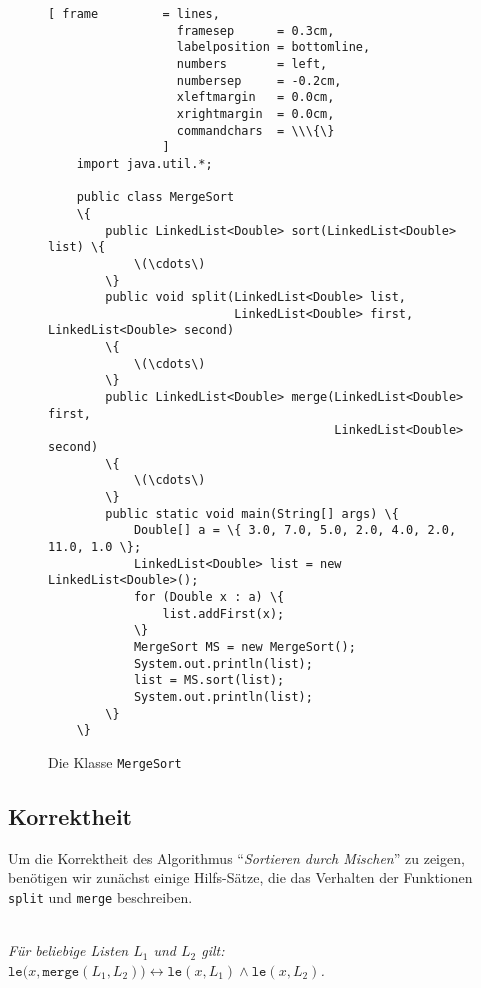\begin{figure}[!ht]
\centering
\begin{Verbatim}[ frame         = lines, 
                  framesep      = 0.3cm, 
                  labelposition = bottomline,
                  numbers       = left,
                  numbersep     = -0.2cm,
                  xleftmargin   = 0.0cm,
                  xrightmargin  = 0.0cm,
                  commandchars  = \\\{\}
                ]
    import java.util.*;
    
    public class MergeSort 
    \{  
        public LinkedList<Double> sort(LinkedList<Double> list) \{
            \(\cdots\)
        \}
        public void split(LinkedList<Double> list,
                          LinkedList<Double> first, LinkedList<Double> second) 
        \{
            \(\cdots\)
        \}
        public LinkedList<Double> merge(LinkedList<Double> first, 
                                        LinkedList<Double> second) 
        \{
            \(\cdots\)
        \}    
        public static void main(String[] args) \{
            Double[] a = \{ 3.0, 7.0, 5.0, 2.0, 4.0, 2.0, 11.0, 1.0 \};
            LinkedList<Double> list = new LinkedList<Double>();
            for (Double x : a) \{
                list.addFirst(x);
            \}
            MergeSort MS = new MergeSort();
            System.out.println(list);
            list = MS.sort(list);
            System.out.println(list);
        \}
    \}
\end{Verbatim}
\vspace*{-0.3cm}
\caption{Die Klasse \texttt{MergeSort}}
\label{fig:MergeSort}
\end{figure}


\subsection{Korrektheit}
Um die Korrektheit des Algorithmus ``\emph{Sortieren durch Mischen}'' zu zeigen, 
ben\"otigen wir zun\"achst einige Hilfs-S\"atze, die das Verhalten der Funktionen \texttt{split} und
\texttt{merge} beschreiben.

\begin{Lemma} \hspace*{\fill} \\
{\em
  F\"ur beliebige Listen $L_1$ und $L_2$ gilt: \\[0.1cm]
  \hspace*{1.3cm} 
  $\texttt{le}\bigl(x,\texttt{merge}(L_1,L_2)\bigr) \leftrightarrow \texttt{le}(x,L_1) \wedge \mathtt{le}(x,L_2)$.
}
\end{Lemma}

